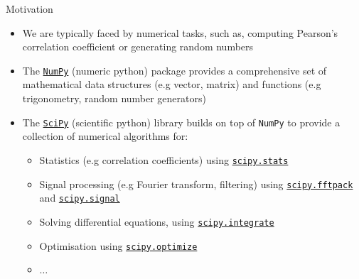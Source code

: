 \documentclass[xcolor=table]{beamer}
\begin{document}
\begin{frame}{Motivation}

\begin{itemize}\addtolength{\itemsep}{\baselineskip}
	\item<1-> We are typically faced by numerical tasks, 
	such as, computing Pearson's correlation coefficient
	or generating random numbers

\item<2-> The \href{https://docs.scipy.org/doc/numpy/user/quickstart.html}{\texttt{NumPy}} (numeric python) package provides a comprehensive set of mathematical data structures (e.g vector, matrix)
	and functions (e.g trigonometry, random number generators) 

	\item<3-> The \href{https://docs.scipy.org/doc/scipy/reference/}{\texttt{SciPy}} (scientific python) library builds on top of \texttt{NumPy} to provide a collection of numerical algorithms for: 
	\begin{itemize}
        \item<4-> Statistics (e.g correlation coefficients) using \href{https://docs.scipy.org/doc/scipy/reference/tutorial/stats.html}{\texttt{scipy.stats}} 
        \item<5-> Signal processing (e.g Fourier transform, filtering) using \href{https://docs.scipy.org/doc/scipy/reference/tutorial/fftpack.html}{\texttt{scipy.fftpack}} and \href{https://docs.scipy.org/doc/scipy/reference/tutorial/signal.html}{\texttt{scipy.signal}} 
        \item<6-> Solving differential equations, using \href{https://docs.scipy.org/doc/scipy/reference/integrate.html}{\texttt{scipy.integrate}} 
        \item<7-> Optimisation using \href{https://docs.scipy.org/doc/scipy/reference/tutorial/optimize.html}{\texttt{scipy.optimize}} 
		\item<8-> $\ldots$
	\end{itemize}
\end{itemize}
\end{frame}
\end{document}
